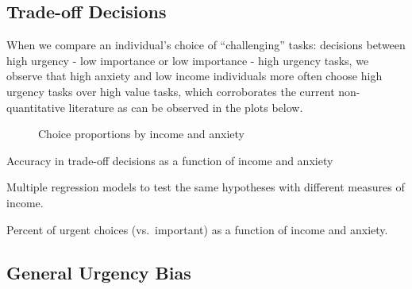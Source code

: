 \documentclass[
]{report}
\begin{document}
\hypertarget{trade-off-decisions}{%
\subsection{Trade-off Decisions}\label{trade-off-decisions}}

When we compare an individual's choice of ``challenging'' tasks:
decisions between high urgency - low importance or low importance - high
urgency tasks, we observe that high anxiety and low income individuals
more often choose high urgency tasks over high value tasks, which
corroborates the current non-quantitative literature as can be observed
in the plots below.

\begin{figure}

\begin{minipage}[t]{0.50\linewidth}

{\centering 


}

\end{minipage}%
%
\begin{minipage}[t]{0.50\linewidth}

{\centering 


}

\end{minipage}%

\caption{\label{fig-tradeoff-results}Choice proportions by income and
anxiety}

\end{figure}

Accuracy in trade-off decisions as a function of income and anxiety

Multiple regression models to test the same hypotheses with different
measures of income.

Percent of urgent choices (vs.~important) as a function of income and
anxiety.

\hypertarget{general-urgency-bias}{%
\subsection{General Urgency Bias}\label{general-urgency-bias}}
\end{document}
